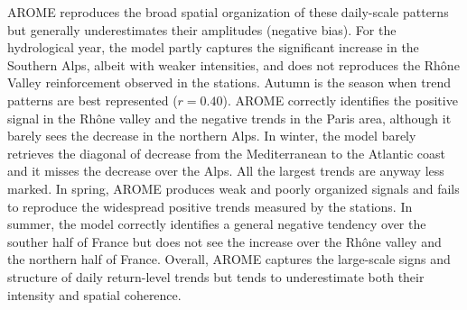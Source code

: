 \documentclass[hess, manuscript]{copernicus}
\begin{document}
AROME reproduces the broad spatial organization of these daily-scale patterns but generally underestimates their amplitudes (negative bias). For the hydrological year, the model partly captures the significant increase in the Southern Alps, albeit with weaker intensities, and does not reproduces the Rhône Valley reinforcement observed in the stations. Autumn is the season when trend patterns are best represented ($r=0.40$). AROME correctly identifies the positive signal in the Rhône valley and the negative trends in the Paris area, although it barely sees the decrease in the northern Alps. In winter, the model barely retrieves the diagonal of decrease from the Mediterranean to the Atlantic coast and it misses the decrease over the Alps. All the largest trends are anyway less marked. In spring, AROME produces weak and poorly organized signals and fails to reproduce the widespread positive trends measured by the stations. In summer, the model correctly identifies a general negative tendency over the souther half of France but does not see the increase over the Rhône valley and the northern half of France. Overall, AROME captures the large-scale signs and structure of daily return-level trends but tends to underestimate both their intensity and spatial coherence.
\end{document}
